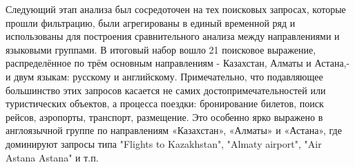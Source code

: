 
Следующий этап анализа был сосредоточен на тех поисковых запросах,
которые прошли фильтрацию, были агрегированы в единый временной ряд и
использованы для построения сравнительного анализа между направлениями и
языковыми группами. В итоговый набор вошло 21 поисковое выражение,
распределённое по трём основным направлениям - Казахстан, Алматы и
Астана,- и двум языкам: русскому и английскому. Примечательно, что
подавляющее большинство этих запросов касается не самих
достопримечательностей или туристических объектов, а процесса поездки:
бронирование билетов, поиск рейсов, аэропорты, транспорт, размещение.
Это особенно ярко выражено в англоязычной группе по направлениям
«Казахстан», «Алматы» и «Астана», где доминируют запросы типа "Flights
to Kazakhstan", "Almaty airport", "Air Astana Astana" и т.п.

